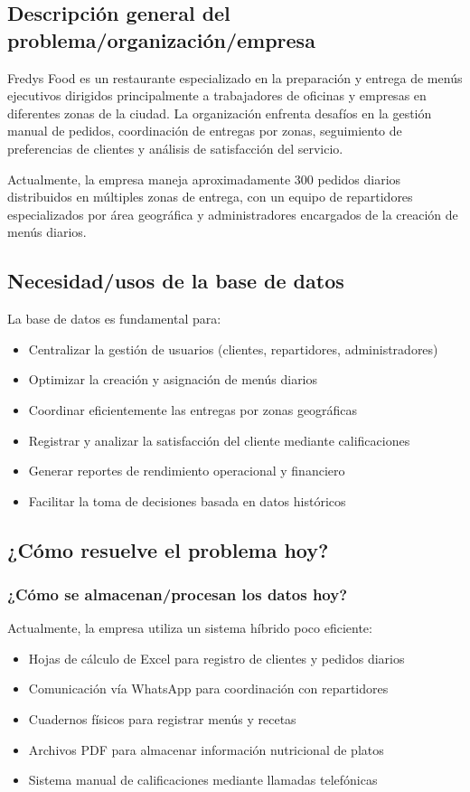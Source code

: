 \documentclass[12pt,a4paper]{article}
\begin{document}
\subsection{Descripción general del problema/organización/empresa}
Fredys Food es un restaurante especializado en la preparación y entrega de menús ejecutivos dirigidos principalmente a trabajadores de oficinas y empresas en diferentes zonas de la ciudad. La organización enfrenta desafíos en la gestión manual de pedidos, coordinación de entregas por zonas, seguimiento de preferencias de clientes y análisis de satisfacción del servicio.

Actualmente, la empresa maneja aproximadamente 300 pedidos diarios distribuidos en múltiples zonas de entrega, con un equipo de repartidores especializados por área geográfica y administradores encargados de la creación de menús diarios.

\subsection{Necesidad/usos de la base de datos}
La base de datos es fundamental para:
\begin{itemize}
    \item Centralizar la gestión de usuarios (clientes, repartidores, administradores)
    \item Optimizar la creación y asignación de menús diarios
    \item Coordinar eficientemente las entregas por zonas geográficas
    \item Registrar y analizar la satisfacción del cliente mediante calificaciones
    \item Generar reportes de rendimiento operacional y financiero
    \item Facilitar la toma de decisiones basada en datos históricos
\end{itemize}

\subsection{¿Cómo resuelve el problema hoy?}
\subsubsection{¿Cómo se almacenan/procesan los datos hoy?}
Actualmente, la empresa utiliza un sistema híbrido poco eficiente:
\begin{itemize}
    \item Hojas de cálculo de Excel para registro de clientes y pedidos diarios
    \item Comunicación vía WhatsApp para coordinación con repartidores
    \item Cuadernos físicos para registrar menús y recetas
    \item Archivos PDF para almacenar información nutricional de platos
    \item Sistema manual de calificaciones mediante llamadas telefónicas
\end{itemize}
\end{document}

